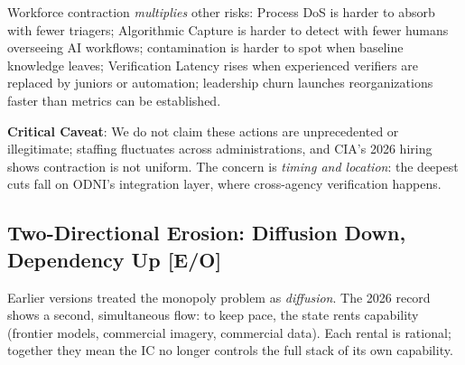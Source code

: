 \documentclass[11pt,letterpaper]{article}
\begin{document}
\begin{warnbox}
Workforce contraction \textit{multiplies} other risks: Process DoS is harder to absorb with fewer triagers; Algorithmic Capture is harder to detect with fewer humans overseeing AI workflows; contamination is harder to spot when baseline knowledge leaves; Verification Latency rises when experienced verifiers are replaced by juniors or automation; leadership churn launches reorganizations faster than metrics can be established.

\textbf{Critical Caveat}: We do not claim these actions are unprecedented or illegitimate; staffing fluctuates across administrations, and CIA's 2026 hiring shows contraction is not uniform. The concern is \textit{timing and location}: the deepest cuts fall on ODNI's integration layer, where cross-agency verification happens.
\end{warnbox}

\subsection{Two-Directional Erosion: Diffusion Down, Dependency Up [E/O]}

Earlier versions treated the monopoly problem as \textit{diffusion}. The 2026 record shows a second, simultaneous flow: to keep pace, the state rents capability (frontier models, commercial imagery, commercial data). Each rental is rational; together they mean the IC no longer controls the full stack of its own capability.
\end{document}
